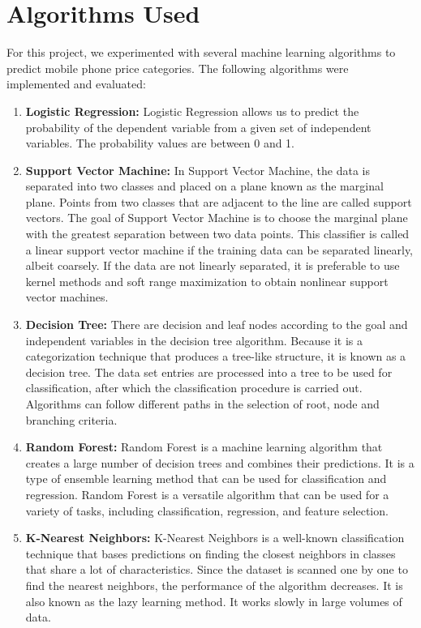 \documentclass[12pt]{report}
\begin{document}
\section{Algorithms Used}
For this project, we experimented with several machine learning algorithms to predict mobile phone price categories. The following algorithms were implemented and evaluated:
\vspace{-1.25em}
\begin{enumerate}
	\setlength\itemsep{-1.05em}

\item{\textbf{Logistic Regression: }}Logistic Regression allows us to predict the probability of the dependent variable from a given set of independent variables. The probability values are between 0 and 1. \cite{hadsonml}
\item{\textbf{Support Vector Machine: }}In Support Vector Machine, the data is separated into two classes and placed on a plane known as the marginal plane. Points from two classes that are adjacent to the line are called support vectors. The goal of Support Vector Machine is to choose the marginal plane with the greatest separation between two data points. This classifier is called a linear support vector machine if the training data can be separated linearly, albeit coarsely. If the data are not linearly separated, it is preferable to use kernel methods and soft range maximization to obtain nonlinear support vector machines. \cite{hadsonml}
\item{\textbf{Decision Tree: }}There are decision and leaf nodes according to the goal and independent variables in the decision tree algorithm. Because it is a categorization technique that produces a tree-like structure, it is known as a decision tree. The data set entries are processed into a tree to be used for classification, after which the classification procedure is carried out. Algorithms can follow different paths in the selection of root, node and branching criteria. \cite{hadsonml}
\item{\textbf{Random Forest: }}
Random Forest is a machine learning algorithm that creates a large number of decision trees and combines their predictions. It is a type of ensemble learning method that can be used for classification and regression. Random Forest is a versatile algorithm that can be used for a variety of tasks, including classification, regression, and feature selection. \cite{hadsonml}
\item{\textbf{K-Nearest Neighbors: }}
K-Nearest Neighbors is a well-known classification technique that bases predictions on finding the closest neighbors in classes that share a lot of characteristics. Since the dataset is scanned one by one to find the nearest neighbors, the performance of the algorithm decreases. It is also known as the lazy learning method. It works slowly in large volumes of data. \cite{hadsonml}

\end{enumerate}
\end{document}

